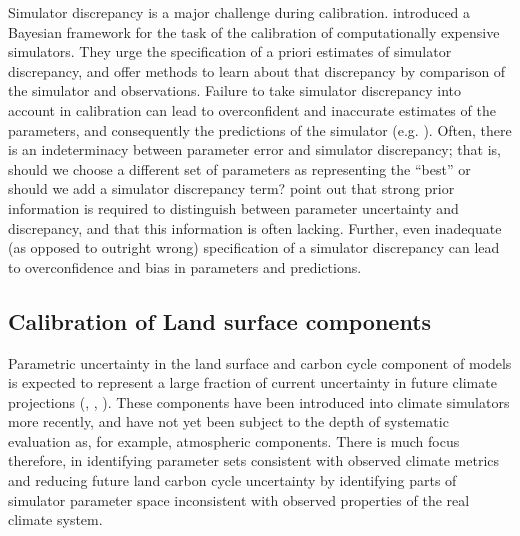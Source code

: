 \documentclass[esd, manuscript]{copernicus}
\begin{document}
Simulator discrepancy is a major challenge during calibration. \cite{kennedy2001bayesian} introduced a Bayesian framework for the task of the calibration of computationally expensive simulators. They urge the specification of a priori estimates of simulator discrepancy, and offer methods to learn about that discrepancy by comparison of the simulator and observations. Failure to take simulator discrepancy into account in calibration can lead to overconfident and inaccurate estimates of the parameters, and consequently the predictions of the simulator (e.g. \cite{higdon2008calibration, brynjarsdottir2014learning}). Often, there is an indeterminacy between parameter error and simulator discrepancy; that is, should we choose a different set of parameters as representing the ``best'' or should we add a simulator discrepancy term? \cite{brynjarsdottir2014learning} point out that strong prior information is required to distinguish between parameter uncertainty and discrepancy, and that this information is often lacking. Further, even inadequate (as opposed to outright wrong) specification of a simulator discrepancy can lead to overconfidence and bias in parameters and predictions.

\subsection{Calibration of Land surface components}

Parametric uncertainty in the land surface and carbon cycle component of models is expected to represent a large fraction of current uncertainty in future climate projections (\cite{booth2012highsensitivity}, \cite{booth2013scenario}, \cite{huntingford2009contributions}). These components have been introduced into climate simulators more recently, and have not yet been subject to the depth of systematic evaluation as, for example, atmospheric components. There is much focus therefore, in identifying parameter sets consistent with observed climate metrics and reducing future land carbon cycle uncertainty by identifying parts of simulator parameter space inconsistent with observed properties of the real climate system. 
\end{document}
